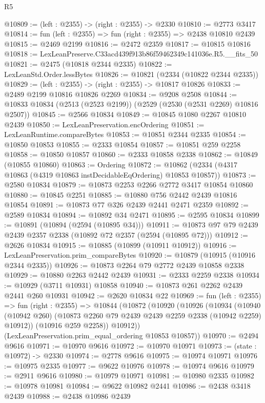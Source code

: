 \begin{lexlean}{R5}
\begin{coremodule}
@10809 := (left : @2355) -> (right : @2355) -> @2330
@10810 := @2773 @3417
@10814 := fun (left : @2355) => fun (right : @2355) => @2438 @10810 @2439
@10815 := @2469 @2199
@10816 := @2472 @2359
@10817 := @10815 @10816
@10818 := LexLeanPreserve.C33acd439f913b86f59462349c141036e.R5.__fits_50
@10821 := @2475 (@10818 @2344 @2335)
@10822 := LexLeanStd.Order.lessBytes
@10826 := @10821 (@2334 (@10822 @2344 @2335))
@10829 := (left : @2355) -> (right : @2355) -> @10817 @10826
@10833 := @2489 @2199 @10816 @10826 @2269
@10834 := @9208 @2508
@10844 := @10833 @10834 (@2513 (@2523 @2199)) (@2529 (@2530 (@2531 @2269) @10816 @2507))
@10845 := @2566 @10834
@10849 := @10845 @1080 @2267 @10810 @2439
@10850 := LexLeanPreservation.encOrdering
@10851 := LexLeanRuntime.compareBytes
@10853 := @10851 @2344 @2335
@10854 := @10850 @10853
@10855 := @2333 @10854
@10857 := @10851 @259 @2258
@10858 := @10850 @10857
@10860 := @2333 @10858 @2338
@10862 := @10849 (@10855 @10860)
@10863 := Ordering
@10872 := @10862 (@2334 (@4317 @10863 (@4319 @10863 instDecidableEqOrdering) @10853 @10857))
@10873 := @2580 @10834
@10879 := @10873 @2253 @2266 @2772 @3417 @10854 @10860
@10880 := @10845 @2251
@10885 := @10880 @756 @2442 @2439 @10816 @10854
@10891 := @10873 @77 @326 @2439 @2441 @2471 @2359
@10892 := @2589 @10834
@10894 := @10892 @34 @2471
@10895 := @2595 @10834
@10899 := @10891 (@10894 (@2594 (@10895 @34)))
@10911 := @10873 @97 @79 @2439 @2439 @2357 @2338 (@10892 @72 @2357 (@2594 (@10895 @72)))
@10912 := @2626 @10834
@10915 := @10885 (@10899 (@10911 @10912))
@10916 := LexLeanPreservation.prim_compareBytes
@10920 := @10879 (@10915 (@10916 @2344 @2335))
@10926 := @10873 @2264 @79 @2772 @2439 @10858 @2338
@10929 := @10880 @2263 @2442 @2439
@10931 := @2333 @2259 @2338
@10934 := @10929 (@3711 @10931) @10858
@10940 := @10873 @261 @2262 @2439 @2441 @260 @10931
@10942 := @2620 @10834 @22
@10969 := fun (left : @2355) =>
  fun (right : @2355) =>
  @10844
    (@10872
      (@10920
        (@10926
          (@10934
            (@10940 (@10942 @260) (@10873 @2260 @79 @2439 @2439 @2259 @2338 (@10942 @2259) @10912))
            (@10916 @259 @2258))
          @10912))
      (LexLeanPreservation.prim_equal_ordering @10853 @10857))
@10970 := @2494 @9616
@10971 := @10970 @9616
@10972 := @10970 @10971
@10973 := (state : @10972) -> @2330
@10974 := @2778 @9616
@10975 := @10974 @10971
@10976 := @10975 @2335
@10977 := @9622 @10976
@10978 := @10974 @9616
@10979 := @2911 @9616
@10980 := @10979 @10971
@10981 := @10980 @2335
@10982 := @10978 @10981
@10984 := @9622 @10982 @2441
@10986 := @2438 @3418 @2439
@10988 := @2438 @10986 @2439

\end{coremodule}
\end{lexlean}
